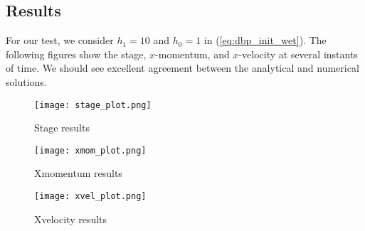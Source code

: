 \subsection{Results}

For our test, we consider $h_1=10$ and $h_0=1$ in (\ref{eq:dbp_init_wet}).
The following figures show the stage, $x$-momentum, and $x$-velocity at several instants of time.
We should see excellent agreement between the analytical and numerical solutions. 

\begin{figure}[h]
\begin{center}
\texttt{[image: stage\_plot.png]}
\end{center}
\caption{Stage results}
\end{figure}


\begin{figure}[h]
\begin{center}
\texttt{[image: xmom\_plot.png]}
\end{center}
\caption{Xmomentum results}
\end{figure}


\begin{figure}[h]
\begin{center}
\texttt{[image: xvel\_plot.png]}
\end{center}
\caption{Xvelocity results}
\end{figure}


\endinput
